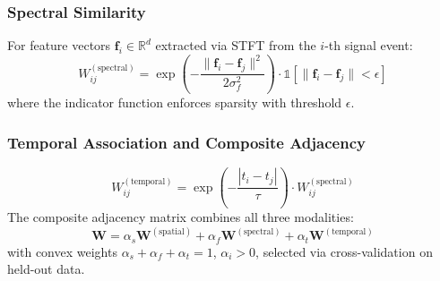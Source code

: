 \documentclass[sensors,article,submit,pdftex]{mdpi}
\newcommand{\vect}[1]{\boldsymbol{#1}}
\newcommand{\mat}[1]{\mathbf{#1}}
\newcommand{\R}{\mathbb{R}}
\begin{document}
\subsubsection{Spectral Similarity}
For feature vectors $\vect{f}_i \in \R^d$ extracted via STFT from the $i$-th signal event:
\begin{equation}
    W_{ij}^{(\text{spectral})} = \exp\!\left( -\frac{\|\vect{f}_i - \vect{f}_j\|^2}{2\sigma_f^2} \right) \cdot \mathbb{1}\!\left[\|\vect{f}_i - \vect{f}_j\| < \epsilon\right]
    \label{eq:spectral_adj}
\end{equation}
where the indicator function enforces sparsity with threshold $\epsilon$.

\subsubsection{Temporal Association and Composite Adjacency}
\begin{equation}
    W_{ij}^{(\text{temporal})} = \exp\!\left( -\frac{|t_i - t_j|}{\tau} \right) \cdot W_{ij}^{(\text{spectral})}
    \label{eq:temporal_adj}
\end{equation}
The composite adjacency matrix combines all three modalities:
\begin{equation}
    \mat{W} = \alpha_s \mat{W}^{(\text{spatial})} + \alpha_f \mat{W}^{(\text{spectral})} + \alpha_t \mat{W}^{(\text{temporal})}
    \label{eq:composite_adj}
\end{equation}
with convex weights $\alpha_s + \alpha_f + \alpha_t = 1$, $\alpha_i > 0$, selected via cross-validation on held-out data.
\end{document}
